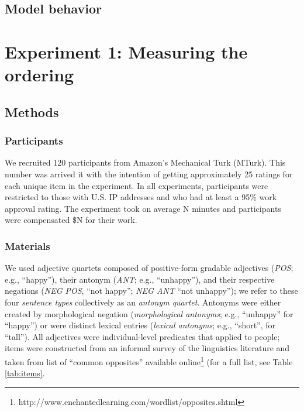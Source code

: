 \documentclass[10pt,letterpaper]{article}
\newcommand{\tableref}[1]{Table \ref{#1}}
\begin{document}
\subsection{Model behavior}


\section{Experiment 1: Measuring the ordering}
\subsection{Methods}
\subsubsection{Participants}

We recruited 120 participants from Amazon's Mechanical Turk (MTurk). 
This number was arrived it with the intention of getting approximately 25 ratings for each unique item in the experiment.
In all experiments, participants were restricted to those with U.S. IP addresses and who had at least a 95\% work approval rating. 
The experiment took on average N minutes and participants were compensated \$N for their work.

\subsubsection{Materials}

We used adjective quartets composed of positive-form gradable adjectives (\emph{POS}; e.g., ``happy''), their antonym (\emph{ANT}; e.g., ``unhappy''), and their respective negations (\emph{NEG POS}, ``not happy''; \emph{NEG ANT} ``not unhappy''); we refer to these four \emph{sentence types} collectively as an \emph{antonym quartet}.
Antonyms were either created by morphological negation (\emph{morphological antonyms}; e.g., ``unhappy'' for ``happy'') or were distinct lexical entries (\emph{lexical antonyms}; e.g., ``short'', for ``tall'').
All adjectives were individual-level predicates that applied to people; items were constructed from an informal survey of the linguistics literature and taken from list of ``common opposites'' available online\footnote{http://www.enchantedlearning.com/wordlist/opposites.shtml} (for a full list, see \tableref{tab:items}.
\end{document}
